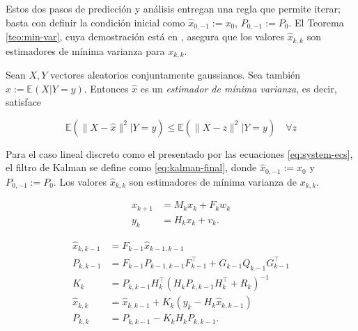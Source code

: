 Estos dos pasos de predicción y análisis entregan una regla que permite iterar; basta con definir la condición inicial como \(\hat{x}_{0,-1} := x_0\), \(P_{0,-1} := P_0\). El Teorema \ref{teo:min-var}, cuya demostración está en \cite{Anderson2005}, asegura que los valores \(\hat{x}_{k,k}\) son estimadores de mínima varianza para \(x_{k,k}\).

\begin{teo}
\label{teo:min-var}
Sean \(X, Y\) vectores aleatorios conjuntamente gaussianos. Sea también \(\hat{x} := \mathbb{E}(X|Y=y)\). Entonces \(\hat{x}\) es un
\emph{estimador de mínima varianza}, es decir, satisface

\[
\mathbb{E}(\| X - \hat{x}\|^2 | Y = y) \leq \mathbb{E}(\| X - z\|^2 | Y = y) \quad \forall z
\]
\end{teo}


\begin{mdframed}[style=mystyle,frametitle=Filtro de Kalman Lineal Discreto]

Para el caso lineal discreto como el presentado por las ecuaciones \ref{eq:system-ecs}, el filtro de Kalman se define como \ref{eq:kalman-final}, donde \(\hat{x}_{0,-1}:= x_0\) y \(P_{0,-1}:= P_0\). Los valores \(\hat{x}_{k,k}\) son estimadores de mínima varianza de \(x_{k,k}\). 

\begin{equation}\label{eq:system-ecs}
\begin{aligned}
x_{k+1} &= M_k x_k + F_k w_k \\ 
y_k &= H_k x_k + v_k.
\end{aligned}
\end{equation}


\begin{equation}\label{eq:kalman-final}
\begin{aligned}
\hat{x}_{k,k-1} &= F_{k-1} \hat{x}_{k-1,k-1} \\
P_{k,k-1} &= F_{k-1} P_{k-1,k-1} F_{k-1}^{\top} + G_{k-1} Q_{k-1} G_{k-1}^{\top}\\
K_k &= P_{k,k-1} H^{\top}_{k}(H_{k}P_{k,k-1}H_{k}^{\top} + R_k)^{-1}\\
\hat{x}_{k,k} &= \hat{x}_{k, k-1} + K_k(y_k-H_k \hat{x}_{k,k-1}) \\
P_{k,k} &= P_{k,k-1}- K_k H_{k}P_{k,k-1}. \\
\end{aligned}
\end{equation}

\end{mdframed}


